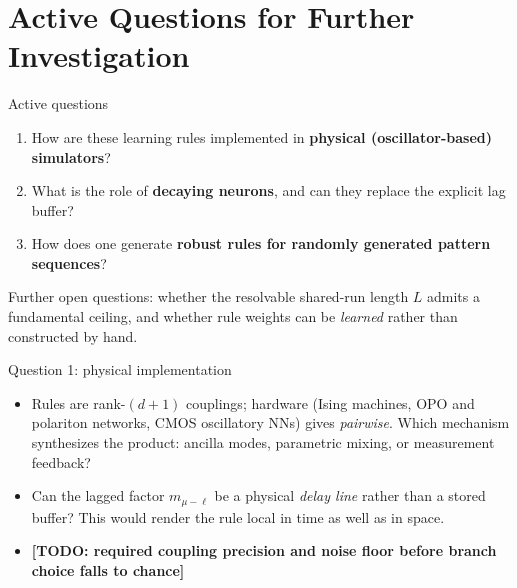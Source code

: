 \documentclass[aspectratio=169]{beamer}
\newcommand{\mvar}{m}
\newcommand{\TODO}[1]{{\color{red}\textbf{[TODO: #1]}}}
\begin{document}
\section[Open Questions]{Active Questions for Further Investigation}

\begin{frame}{Active questions}
  \begin{enumerate}
    \item How are these learning rules implemented in \textbf{physical
      (oscillator-based) simulators}?
    \item What is the role of \textbf{decaying neurons}, and can they
      replace the explicit lag buffer?
    \item How does one generate \textbf{robust rules for randomly generated
      pattern sequences}?
  \end{enumerate}
  \vspace{3mm}
  {\small Further open questions: whether the resolvable shared-run length
  $L$ admits a fundamental ceiling, and whether rule weights can be
  \emph{learned} rather than constructed by hand.}
\end{frame}

\begin{frame}{Question 1: physical implementation}
  \begin{itemize}
    \item Rules are rank-$(d{+}1)$ couplings; hardware (Ising machines, OPO
      and polariton networks, CMOS oscillatory NNs) gives \emph{pairwise}.
      Which mechanism synthesizes the product: ancilla modes, parametric
      mixing, or measurement feedback?
    \item Can the lagged factor $\mvar_{\mu-\ell}$ be a physical \emph{delay
      line} rather than a stored buffer? This would render the rule local
      in time as well as in space.
    \item \TODO{required coupling precision and noise floor before branch
      choice falls to chance}
  \end{itemize}
\end{frame}
\end{document}
